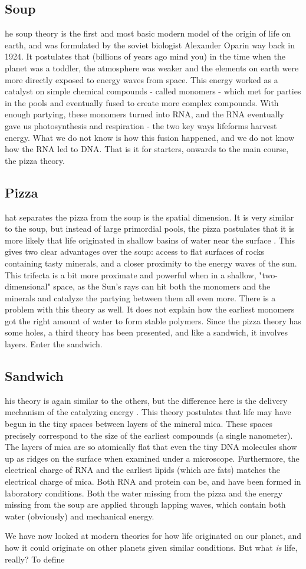 \subsection{Soup}
he soup theory is the first and most basic modern model of the origin of life on earth, and was formulated by the soviet biologist Alexander Oparin way back in 1924.
It postulates \cite{shapiro} that (billions of years ago mind you) in the time when the planet was a toddler, the atmosphere was weaker and the elements on earth were more directly exposed to energy waves from space.
This energy worked as a catalyst on simple chemical compounds - called monomers - which met for parties in the pools and eventually fused to create more complex compounds.
With enough partying, these monomers turned into RNA, and the RNA eventually gave us photosynthesis and respiration - the two key ways lifeforms harvest energy.
What we do not know is how this fusion happened, and we do not know how the RNA led to DNA.
That is it for starters, onwards to the main course, the pizza theory.

\subsection{Pizza}
hat separates the pizza from the soup is the spatial dimension.
It is very similar to the soup, but instead of large primordial pools, the pizza postulates that it is more likely that life originated in shallow basins of water near the surface \cite{Exoboken}.
This gives two clear advantages over the soup: access to flat surfaces of rocks containing tasty minerals, and a closer proximity to the energy waves of the sun.
This trifecta is a bit more proximate and powerful when in a shallow, "two-dimensional" space, as the Sun’s rays can hit both the monomers and the minerals and catalyze the partying between them all even more.
There is a problem with this theory as well.
It does not explain how the earliest monomers got the right amount of water to form stable polymers.
Since the pizza theory has some holes, a third theory has been presented, and like a sandwich, it involves layers.
Enter the sandwich.

\subsection{Sandwich}
his theory is again similar to the others, but the difference here is the delivery mechanism of the catalyzing energy \cite{szosa}.
This theory postulates that life may have begun in the tiny spaces between layers of the mineral mica.
These spaces precisely correspond to the size of the earliest compounds (a single nanometer).
The layers of mica are so atomically flat that even the tiny DNA molecules show up as ridges on the surface when examined under a microscope.
Furthermore, the electrical charge of RNA and the earliest lipids (which are fats) matches the electrical charge of mica.
Both RNA and protein can be, and have been formed in laboratory conditions.
Both the water missing from the pizza and the energy missing from the soup are applied through lapping waves, which contain both water (obviously) and mechanical energy.

We have now looked at modern theories for how life originated on our planet, and how it could originate on other planets given similar conditions. But what \emph{is} life, really? To define